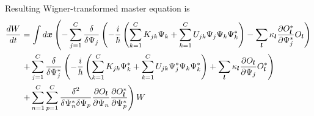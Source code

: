 Resulting Wigner-transformed master equation is
\begin{equation*}
\begin{split}
	\frac{dW}{dt}
	& = \int d\boldsymbol{x} \left(
		- \sum_{j=1}^C \frac{\delta}{\delta \Psi_j} \left(
			-\frac{i}{\hbar} \left(
				\sum_{k=1}^C K_{jk} \Psi_k
				+ \sum_{k=1}^C U_{jk} \Psi_j \Psi_k \Psi_k^*
			\right)
			- \sum_{\boldsymbol{l}} \kappa_{\boldsymbol{l}} \frac{\partial O_{\boldsymbol{l}}^*}{\partial \Psi_j^*} O_{\boldsymbol{l}}
		\right)
	\right. \\
	& \left. + \sum_{j=1}^C \frac{\delta}{\delta \Psi_j^*} \left(
		-\frac{i}{\hbar} \left(
			\sum_{k=1}^C K_{jk} \Psi_k^*
			+ \sum_{k=1}^C U_{jk} \Psi_j^* \Psi_k \Psi_k^*
		\right)
		+ \sum_{\boldsymbol{l}} \kappa_{\boldsymbol{l}} \frac{\partial O_{\boldsymbol{l}}}{\partial \Psi_j} O_{\boldsymbol{l}}^*
	\right) \right. \\
	& \left. + \sum_{n=1}^C \sum_{p=1}^C \frac{\delta^2}{\delta \Psi_n^* \delta \Psi_p}
		\frac{\partial O_{\boldsymbol{l}}}{\partial \Psi_n}
		\frac{\partial O_{\boldsymbol{l}}^*}{\partial \Psi_p^*}
	\right) W
\end{split}
\end{equation*}

